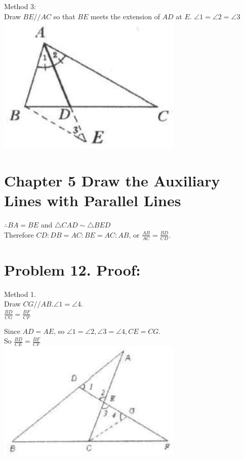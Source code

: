 \documentclass[10pt]{article}
\begin{document}
Method 3:\\
Draw \(B E / / A C\) so that \(B E\) meets the extension of \(A D\) at \(E\). \(\angle 1=\angle 2=\angle 3\)\\
\includegraphics[max width=\textwidth, center]{2025_04_17_97bc1f7e44d93c271a88g-136}

\section*{Chapter 5 Draw the Auxiliary Lines with Parallel Lines}
\(\therefore B A=B E\) and \(\triangle C A D \sim \triangle B E D\)\\
Therefore \(C D: D B=A C: B E=A C: A B\), or \(\frac{A B}{A C}=\frac{B D}{C D}\).

\section*{Problem 12. Proof:}
Method 1.\\
Draw \(C G / / A B . \angle 1=\angle 4\).\\
\(\frac{B D}{C G}=\frac{B F}{C F}\)

Since \(A D=A E\), so \(\angle 1=\angle 2, \angle 3=\angle 4, C E=C G\).\\
So \(\frac{B D}{C E}=\frac{B F}{C F}\)\\
\includegraphics[max width=\textwidth, center]{2025_04_17_97bc1f7e44d93c271a88g-137(2)}
\end{document}

